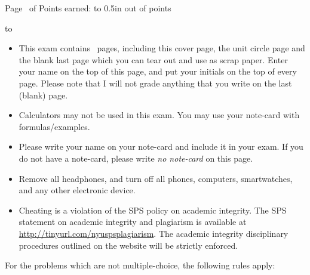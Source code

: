 \documentclass[11pt,answers]{exam}
\begin{document}
	\extrawidth{-0.3in}
	\pagestyle{headandfoot}
	
	\setlength{\hoffset}{-.25in}
	
	\extraheadheight{-.4in}
	\runningheadrule
	
	
	
	\firstpagefooter{\bfseries{}}{}{} 
	
	
	\runningheader{\bfseries {}}%
	{\bfseries {}}%
	{Page \thepage\ 
		of \numpages 
	}
	\runningfooter{} %
	{}
	{Points earned: \hbox to 0.5in{\hrulefill}
		out of  \pointsonpage{\thepage} points}
	
	
	
	\vspace*{0.2cm}
	\hbox to 
	\vspace{0.2in}
	
	\begin{itemize}
		\item This exam contains \numpages\ pages, including this cover page, the unit circle page and the blank last page which you can tear out and use as scrap paper. Enter
		your name on the top of this page, and put your initials
		on the top of every page. Please note that I will not grade anything that you write on the last (blank) page.
		
		
		\item Calculators may not be used in this exam. You may use your note-card with formulas/examples. 
		
		\item Please write your name on your note-card and include it in your exam. If you do not have a note-card, please write {\textit {no note-card}} on this page.
		\item Remove all headphones, and turn off all phones, computers, smartwatches, and any other electronic device.
		\item Cheating is a violation of the SPS policy on academic integrity. The SPS statement on academic integrity and
		plagiarism is available at \url{http://tinyurl.com/nyuspsplagiarism}. The academic integrity disciplinary procedures outlined on the
		website will be strictly enforced.
		
	\end{itemize}
	
	For the problems which are not multiple-choice, the following rules apply:\\
	
\end{document}
